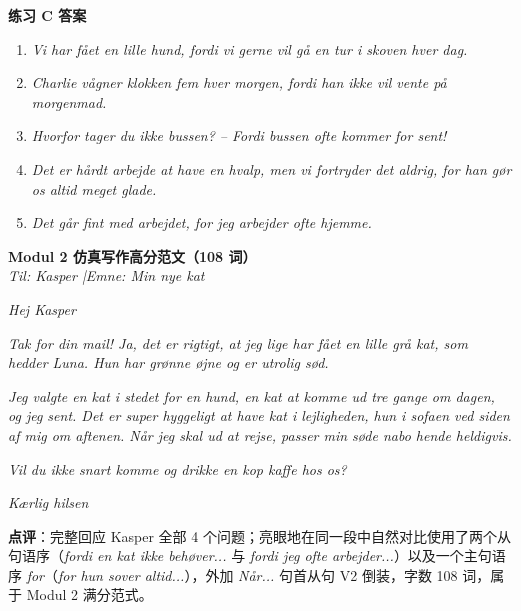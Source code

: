 \begin{answerbox}
\textbf{练习 C 答案}
\begin{enumerate}
  \item \textit{Vi har fået en lille hund, fordi vi gerne vil gå en tur i skoven hver dag.}
  \item \textit{Charlie vågner klokken fem hver morgen, fordi han ikke vil vente på morgenmad.}
  \item \textit{Hvorfor tager du ikke bussen? -- Fordi bussen ofte kommer for sent!}
  \item \textit{Det er hårdt arbejde at have en hvalp, men vi fortryder det aldrig, for han gør os altid meget glade.}
  \item \textit{Det går fint med arbejdet, for jeg arbejder ofte hjemme.}
\end{enumerate}

\textbf{Modul 2 仿真写作高分范文（108 词）}\\
\textit{Til: Kasper \quad|\quad Emne: Min nye kat}

\textit{Hej Kasper}

\textit{Tak for din mail! Ja, det er rigtigt, at jeg lige har fået en lille grå kat, som hedder Luna. Hun har grønne øjne og er utrolig sød.}

\textit{Jeg valgte en kat i stedet for en hund,  en kat  at komme ud tre gange om dagen, og  jeg  sent. Det er super hyggeligt at have kat i lejligheden,  hun  i sofaen ved siden af mig om aftenen. Når jeg skal ud at rejse, passer min søde nabo hende heldigvis.}

\textit{Vil du ikke snart komme og drikke en kop kaffe hos os?}

\textit{Kærlig hilsen\\
}

\small\textbf{点评}：完整回应 Kasper 全部 4 个问题；亮眼地在同一段中自然对比使用了两个从句语序（\textit{fordi en kat ikke behøver...} 与 \textit{fordi jeg ofte arbejder...}）以及一个主句语序 \textit{for}（\textit{for hun sover altid...}），外加 \textit{Når...} 句首从句 V2 倒装，字数 108 词，属于 Modul 2 满分范式。
\end{answerbox}
